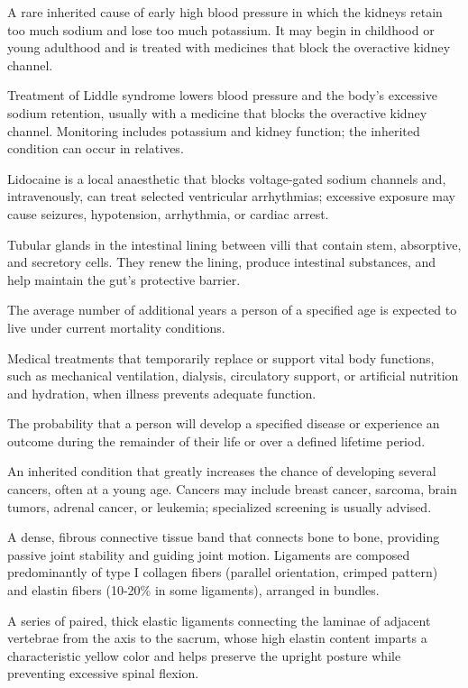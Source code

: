  A rare inherited cause of early high blood pressure in which the kidneys retain too much sodium and lose too much potassium. It may begin in childhood or young adulthood and is treated with medicines that block the overactive kidney channel.

 Treatment of Liddle syndrome lowers blood pressure and the body’s excessive sodium retention, usually with a medicine that blocks the overactive kidney channel. Monitoring includes potassium and kidney function; the inherited condition can occur in relatives.

 Lidocaine is a local anaesthetic that blocks voltage-gated sodium channels and, intravenously, can treat selected ventricular arrhythmias; excessive exposure may cause seizures, hypotension, arrhythmia, or cardiac arrest.

 Tubular glands in the intestinal lining between villi that contain stem, absorptive, and secretory cells. They renew the lining, produce intestinal substances, and help maintain the gut’s protective barrier.

 The average number of additional years a person of a specified age is expected to live under current mortality conditions.

 Medical treatments that temporarily replace or support vital body functions, such as mechanical ventilation, dialysis, circulatory support, or artificial nutrition and hydration, when illness prevents adequate function.

 The probability that a person will develop a specified disease or experience an outcome during the remainder of their life or over a defined lifetime period.

 An inherited condition that greatly increases the chance of developing several cancers, often at a young age. Cancers may include breast cancer, sarcoma, brain tumors, adrenal cancer, or leukemia; specialized screening is usually advised.

 A dense, fibrous connective tissue band that connects bone to bone, providing passive
joint stability and guiding joint motion. Ligaments are composed predominantly of type I
collagen fibers (parallel orientation, crimped pattern) and elastin fibers (10-20\% in
some ligaments), arranged in bundles.

 A series of paired, thick elastic ligaments connecting the laminae of adjacent vertebrae from the axis to the sacrum, whose high elastin content imparts a characteristic yellow color and helps preserve the upright posture while preventing excessive spinal flexion.

